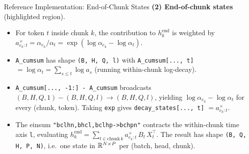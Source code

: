 \begin{frame}[fragile]{Reference Implementation: End-of-Chunk States}
  \vspace{0.3em}
  \textbf{(2) End-of-chunk states} (highlighted region).
  \begin{itemize}\itemsep1pt
    \item For token $t$ inside chunk $k$, the contribution to $h_k^{\text{end}}$ is weighted by $a^\times_{e_k : t} = \alpha_{e_k}/\alpha_t = \exp(\log\alpha_{e_k} - \log\alpha_t)$.
    \item \texttt{A\_cumsum} has shape \texttt{(B, H, Q, l)} with \texttt{A\_cumsum[..., t]} $= \log\alpha_t = \sum_{s \le t}\log a_s$ (running within-chunk log-decay).
    \item \texttt{A\_cumsum[..., -1:] - A\_cumsum} broadcasts $(B,H,Q,1) - (B,H,Q,l) \to (B,H,Q,l)$, yielding $\log\alpha_{e_k} - \log\alpha_t$ for every (chunk, token). Taking \texttt{exp} gives \texttt{decay\_states[..., t]} $= a^\times_{e_k : t}$.
    \item The einsum \texttt{"bclhn,bhcl,bclhp->bchpn"} contracts the within-chunk time axis \texttt{l}, evaluating $h_k^{\text{end}} = \sum_{t \in \text{chunk}\,k} a^\times_{e_k:t}\,B_t\,X_t^{\!\top}$. The result has shape \texttt{(B, Q, H, P, N)}, i.e.\ one state in $\mathbb{R}^{N \times P}$ per (batch, head, chunk).
  \end{itemize}
\end{frame}

